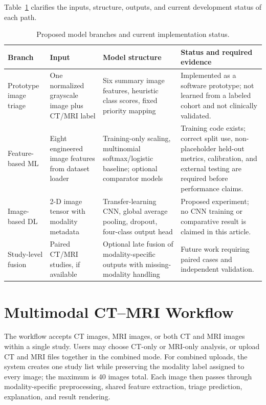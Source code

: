 \documentclass[10pt,a4paper]{article}
\begin{document}
Table~\ref{tab:model-branches} clarifies the inputs, structure, outputs, and current development status of each path.
\begin{table}[t]
\centering
\small
\caption{Proposed model branches and current implementation status.}
\label{tab:model-branches}
\begin{tabular}{p{}p{}p{}p{}}
\toprule
Branch & Input & Model structure & Status and required evidence \\
\midrule
Prototype image triage & One normalized grayscale image plus CT/MRI label & Six summary image features, heuristic class scores, fixed priority mapping & Implemented as a software prototype; not learned from a labeled cohort and not clinically validated. \\
Feature-based ML & Eight engineered image features from dataset loader & Training-only scaling, multinomial softmax/logistic baseline; optional comparator models & Training code exists; correct split use, non-placeholder held-out metrics, calibration, and external testing are required before performance claims. \\
Image-based DL & 2-D image tensor with modality metadata & Transfer-learning CNN, global average pooling, dropout, four-class output head & Proposed experiment; no CNN training or comparative result is claimed in this article. \\
Study-level fusion & Paired CT/MRI studies, if available & Optional late fusion of modality-specific outputs with missing-modality handling & Future work requiring paired cases and independent validation. \\
\bottomrule
\end{tabular}
\end{table}

\section{Multimodal CT--MRI Workflow}
The workflow accepts CT images, MRI images, or both CT and MRI images within a single study. Users may choose CT-only or MRI-only analysis, or upload CT and MRI files together in the combined mode. For combined uploads, the system creates one study list while preserving the modality label assigned to every image; the maximum is 40 images total. Each image then passes through modality-specific preprocessing, shared feature extraction, triage prediction, explanation, and result rendering.
\end{document}
